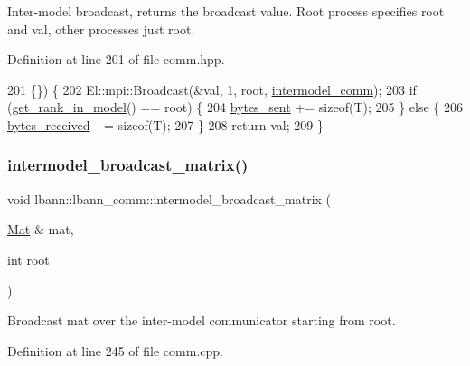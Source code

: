 Inter-\/model broadcast, returns the broadcast value. Root process specifies root and val, other processes just root. 

Definition at line 201 of file comm.\+hpp.


\begin{DoxyCode}
201                                            \{\}) \{
202     El::mpi::Broadcast(&val, 1, root, \hyperlink{classlbann_1_1lbann__comm_a2c51c5d8faf4f0ab4f43b892c55e597b}{intermodel\_comm});
203     \textcolor{keywordflow}{if} (\hyperlink{classlbann_1_1lbann__comm_a789453454468a3b70de768537c50ca52}{get\_rank\_in\_model}() == root) \{
204       \hyperlink{classlbann_1_1lbann__comm_ad1f146ae7337ece6266fd307944928e0}{bytes\_sent} += \textcolor{keyword}{sizeof}(T);
205     \} \textcolor{keywordflow}{else} \{
206       \hyperlink{classlbann_1_1lbann__comm_afb99f57f7eafc0695bf28e6c26a8120f}{bytes\_received} += \textcolor{keyword}{sizeof}(T);
207     \}
208     \textcolor{keywordflow}{return} val;
209   \}
\end{DoxyCode}
\mbox{\label{classlbann_1_1lbann__comm_a4989229db1ee858c5a2170a989653d0b}} 
\subsubsection{\texorpdfstring{intermodel\+\_\+broadcast\+\_\+matrix()}{intermodel\_broadcast\_matrix()}\hspace{0.1cm}{\footnotesize\ttfamily [1/2]}}
{\footnotesize\ttfamily void lbann\+::lbann\+\_\+comm\+::intermodel\+\_\+broadcast\+\_\+matrix (\begin{DoxyParamCaption}\item[{\hyperlink{base_8hpp_a68f11fdc31b62516cb310831bbe54d73}{Mat} \&}]{mat,  }\item[{int}]{root }\end{DoxyParamCaption})}

Broadcast mat over the inter-\/model communicator starting from root. 

Definition at line 245 of file comm.\+cpp.


